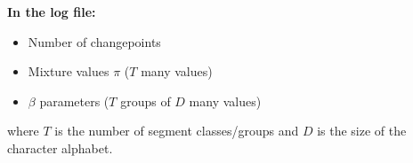 \textbf{In the log file:}
    \begin{itemize}
        \item Number of changepoints
        \item Mixture values $\pi$ ($T$ many values)
        \item $\beta$ parameters ($T$ groups of $D$ many values)
    \end{itemize}
    
where $T$ is the number of segment classes/groups and $D$ is the size of the character alphabet.